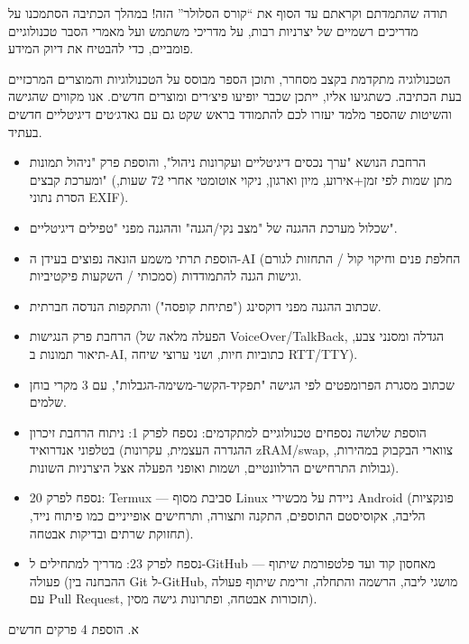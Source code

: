
תודה שהתמדתם וקראתם עד הסוף את “קורס הסלולר” הזה! במהלך הכתיבה הסתמכנו על מדריכים רשמיים של יצרניות רבות, על מדריכי משתמש ועל מאמרי הסבר טכנולוגיים פומביים, כדי להבטיח את דיוק המידע.

הטכנולוגיה מתקדמת בקצב מסחרר, ותוכן הספר מבוסס על הטכנולוגיות והמוצרים המרכזיים בעת הכתיבה. כשתגיעו אליו, ייתכן שכבר יופיעו פיצ׳רים ומוצרים חדשים. אנו מקווים שהגישה והשיטות שהספר מלמד יעזרו לכם להתמודד בראש שקט גם עם גאדג׳טים דיגיטליים חדשים בעתיד.


\begin{itemize}
  \item הרחבת הנושא "ערך נכסים דיגיטליים ועקרונות ניהול", והוספת פרק "ניהול תמונות ומערכת קבצים" (מתן שמות לפי זמן+אירוע, מיון וארגון, ניקוי אוטומטי אחרי 72 שעות, הסרת נתוני EXIF).
  \item שכלול מערכת ההגנה של "מצב נקי/הגנה" וההגנה מפני "טפילים דיגיטליים".
  \item הוספת תרתי משמע הונאה נפוצים בעידן ה-AI (החלפת פנים וחיקוי קול / התחזות לגורם סמכותי / השקעות פיקטיביות) וגישות הגנה להתמודדות.
  \item שכתוב ההגנה מפני דוקסינג ("פתיחת קופסה") והתקפות הנדסה חברתית.
  \item הרחבת פרק הנגישות (הפעלה מלאה של VoiceOver/TalkBack, הגדלה ומסנני צבע, תיאור תמונות ב-AI, כתוביות חיות, ושני ערוצי שיחה RTT/TTY).
  \item שכתוב מסגרת הפרומפטים לפי הגישה "תפקיד-הקשר-משימה-הגבלות", עם 3 מקרי בוחן שלמים.
  \item הוספת שלושה נספחים טכנולוגיים למתקדמים: נספח לפרק 1: ניתוח הרחבת זיכרון בטלפוני אנדרואיד (ההגדרה העצמית, עקרונות zRAM/swap, צווארי הבקבוק במהירות, גבולות התרחישים הרלוונטיים, ושמות ואופני הפעלה אצל היצרניות השונות).
  \item נספח לפרק 20: Termux — סביבת מסוף Linux ניידת על מכשירי Android (פונקציות הליבה, אקוסיסטם התוספים, התקנה ותצורה, ותרחישים אופייניים כמו פיתוח נייד, תחזוקת שרתים ובדיקות אבטחה).
  \item נספח לפרק 23: מדריך למתחילים ל-GitHub — מאחסון קוד ועד פלטפורמת שיתוף פעולה (ההבחנה בין Git ל-GitHub, מושגי ליבה, הרשמה והתחלה, זרימת שיתוף פעולה עם Pull Request, תזכורות אבטחה, ופתרונות גישה מסין).
\end{itemize}


א. הוספת 4 פרקים חדשים

